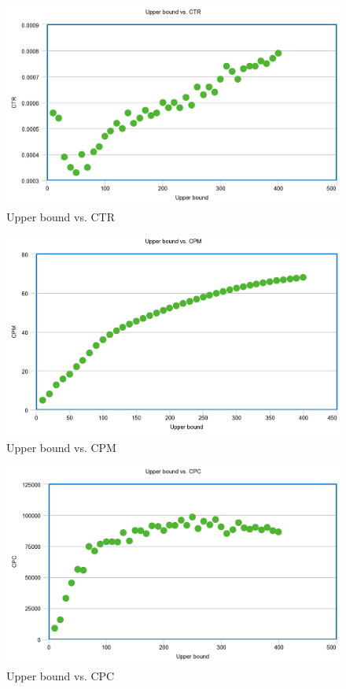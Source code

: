 \documentclass{sig-alternate-05-2015}
\begin{document}
\begin{figure}
  \includegraphics[width=\linewidth]{random_ctr.png}
  \caption{Upper bound vs. CTR}
  \label{fig:CPM}
\end{figure}

\begin{figure}
  \includegraphics[width=\linewidth]{random_cpm.png}
  \caption{Upper bound vs. CPM}
  \label{fig:CPM}
\end{figure}

\begin{figure}
  \includegraphics[width=\linewidth]{random_cpc.png}
  \caption{Upper bound vs. CPC}
  \label{fig:CPM}
\end{figure}
\end{document}
